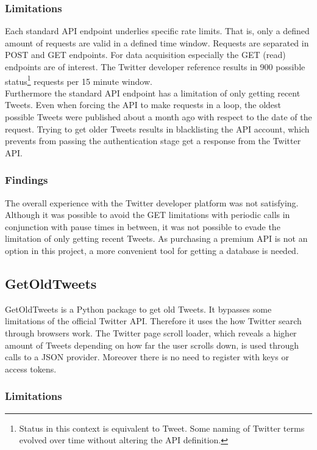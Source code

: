 \documentclass[conference]{IEEEtran}
\begin{document}
\subsubsection{Limitations}

Each standard API endpoint underlies specific rate limits. That is, only a defined amount of requests are valid in a defined time window. Requests are separated in POST and GET endpoints. For data acquisition especially the GET (read) endpoints are of interest. The Twitter developer reference results in 900 possible status\footnote{Status in this context is equivalent to Tweet. Some naming of Twitter terms evolved over time without altering the API definition.} requests per 15 minute window.\\
Furthermore the standard API endpoint has a limitation of only getting recent Tweets. Even when forcing the API to make requests in a loop, the oldest possible Tweets were published about a month ago with respect to the date of the request. Trying to get older Tweets results in blacklisting the API account, which prevents from passing the authentication stage get a response from the Twitter API. 

\subsubsection{Findings}

The overall experience with the Twitter developer platform was not satisfying. Although it was possible to avoid the GET limitations with periodic calls in conjunction with pause times in between, it was not possible to evade the limitation of only getting recent Tweets. As purchasing a premium API is not an option in this project, a more convenient tool for getting a database is needed.

\subsection{GetOldTweets}\label{subsec_got}

GetOldTweets \cite{got} is a Python package to get old Tweets. It bypasses some limitations of the official Twitter API. Therefore it uses the how Twitter search through browsers work. The Twitter page scroll loader, which reveals a higher amount of Tweets depending on how far the user scrolls down, is used through calls to a JSON provider. Moreover there is no need to register with keys or access tokens.

\subsubsection{Limitations}
\end{document}
